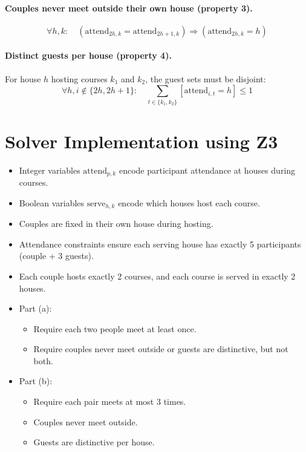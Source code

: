 \documentclass{article}
\begin{document}
\paragraph{Couples never meet outside their own house (property 3).}
\[
\forall h,k:\quad (\text{attend}_{2h,k} = \text{attend}_{2h+1,k}) \Rightarrow (\text{attend}_{2h,k} = h)
\]





\paragraph{Distinct guests per house (property 4).}  
For house $h$ hosting courses $k_1$ and $k_2$, the guest sets must be disjoint:
\[
\forall h, i \notin \{2h,2h+1\}:\quad \sum_{t\in\{k_1,k_2\}} [\text{attend}_{i,t} = h] \le 1
\]

\section{Solver Implementation using Z3}

\begin{itemize}
    \item Integer variables $\text{attend}_{p,k}$ encode participant attendance at houses during courses.
    \item Boolean variables $\text{serve}_{h,k}$ encode which houses host each course.
    \item Couples are fixed in their own house during hosting.
    \item Attendance constraints ensure each serving house has exactly 5 participants (couple + 3 guests).
    \item Each couple hosts exactly 2 courses, and each course is served in exactly 2 houses.
    \item Part (a):
    \begin{itemize}
        \item Require each two people meet at least once.
        \item Require couples never meet outside or guests are distinctive, but not both.
    \end{itemize}
    \item Part (b):
    \begin{itemize}
        \item Require each pair meets at most 3 times.
        \item Couples never meet outside.
        \item Guests are distinctive per house.
    \end{itemize}
\end{itemize}
\end{document}
